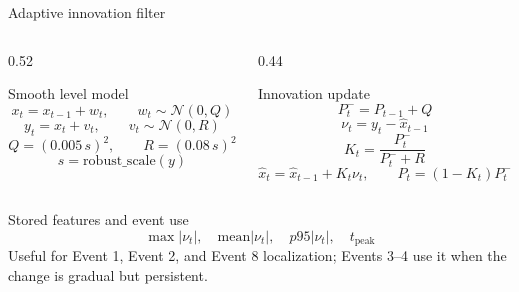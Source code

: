 ﻿\documentclass[10pt,aspectratio=169]{beamer}
\begin{document}
\fi
\begin{frame}{Adaptive innovation filter}
\small
\begin{columns}[T,totalwidth=\textwidth]
\begin{column}{0.52\textwidth}
\begin{block}{Smooth level model}
\[
x_t=x_{t-1}+w_t,\qquad w_t\sim\mathcal{N}(0,Q)
\]
\[
y_t=x_t+v_t,\qquad v_t\sim\mathcal{N}(0,R)
\]
\[
Q=(0.005\,s)^2,\qquad R=(0.08\,s)^2
\]
\[
s=\mathrm{robust\_scale}(y)
\]
\end{block}
\end{column}
\begin{column}{0.44\textwidth}
\begin{alertblock}{Innovation update}
\[
P_t^- = P_{t-1}+Q
\]
\[
\nu_t=y_t-\hat{x}_{t-1}
\]
\[
K_t=\frac{P_t^-}{P_t^-+R}
\]
\[
\hat{x}_t=\hat{x}_{t-1}+K_t\nu_t,\qquad
P_t=(1-K_t)P_t^-
\]
\end{alertblock}
\end{column}
\end{columns}
\vspace{1mm}
\begin{exampleblock}{Stored features and event use}
\[
\max|\nu_t|,\quad \mathrm{mean}|\nu_t|,\quad p95|\nu_t|,\quad t_{\mathrm{peak}}
\]
Useful for Event 1, Event 2, and Event 8 localization; Events 3--4 use it when the change is gradual but persistent.
\end{exampleblock}
\end{frame}
\end{document}
